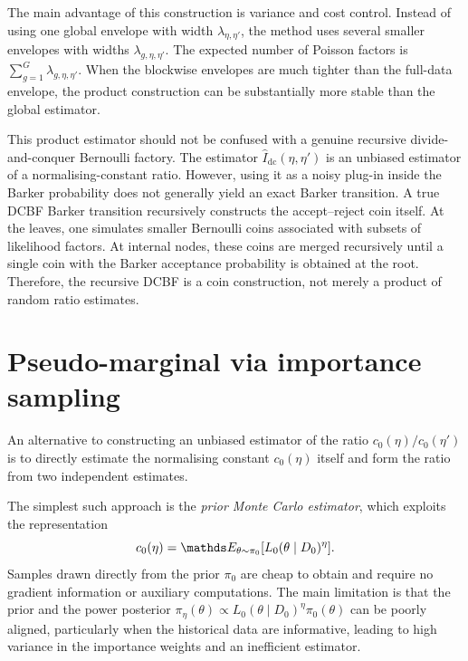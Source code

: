 The main advantage of this construction is variance and cost control.
Instead of using one global envelope with width $\lambda_{\eta,\eta'}$, the method uses several smaller envelopes with widths $\lambda_{g,\eta,\eta'}$.
The expected number of Poisson factors is $\sum_{g=1}^{G}\lambda_{g,\eta,\eta'}$.
When the blockwise envelopes are much tighter than the full-data envelope, the product construction can be substantially more stable than the global estimator.

This product estimator should not be confused with a genuine recursive divide-and-conquer Bernoulli factory.
The estimator $\widehat I_{\mathrm{dc}}(\eta,\eta')$ is an unbiased estimator of a normalising-constant ratio.
However, using it as a noisy plug-in inside the Barker probability does not generally yield an exact Barker transition.
A true DCBF Barker transition recursively constructs the accept--reject coin itself.
At the leaves, one simulates smaller Bernoulli coins associated with subsets of likelihood factors.
At internal nodes, these coins are merged recursively until a single coin with the Barker acceptance probability is obtained at the root.
Therefore, the recursive DCBF is a coin construction, not merely a product of random ratio estimates.

\section{Pseudo-marginal via importance sampling}
\label{sec:pseudo-marginal-is}

An alternative to constructing an unbiased estimator of the ratio $c_0(\eta)/c_0(\eta')$ is to directly estimate the normalising constant $c_0(\eta)$ itself and form the ratio from two independent estimates.

The simplest such approach is the \emph{prior Monte Carlo estimator}, which exploits the representation
\begin{equation*}
    c_0(\eta) = \bE_{\theta\sim\pi_0}\qty[L_0(\theta\mid D_0)^\eta].
\end{equation*}
Samples drawn directly from the prior $\pi_0$ are cheap to obtain and require no gradient information or auxiliary computations.
The main limitation is that the prior and the power posterior $\pi_\eta(\theta) \propto L_0(\theta \mid D_0)^\eta \pi_0(\theta)$ can be poorly aligned, particularly when the historical data are informative, leading to high variance in the importance weights and an inefficient estimator.

